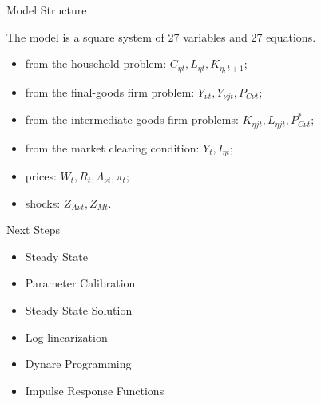\documentclass[
presentation.tex
]{subfiles}
\begin{document}
\begin{frame}{Model Structure}
	
	The model is a square system of 27 variables and 27 equations.
	
	\begin{itemize}
		
		\item from the household problem: $C_{\eta t}, L_{\eta t}, K_{\eta, t+1}$;
		
		\item from the final-goods firm problem: $Y_{\nu t}, Y_{\nu jt}, P_{C\nu t}$;
		
		\item from the intermediate-goods firm problems: $K_{\eta jt}, L_{\eta jt}, P_{C\nu t}^\ast$;
		
		\item from the market clearing condition: $Y_t, I_{\eta t}$;
		
		\item prices: $W_t, R_t, \Lambda_{\nu t}, \pi_t$;
		
		\item shocks: $Z_{A\nu t}, Z_{Mt}$.
		
	\end{itemize}
	
\end{frame}


\begin{frame}{Next Steps}
	
	\begin{itemize}
		
		\item Steady State
		
		\item Parameter Calibration
		
		\item Steady State Solution
		
		\item Log-linearization
		
		\item Dynare Programming
		
		\item Impulse Response Functions
		
	\end{itemize}
	
\end{frame}
\end{document}
